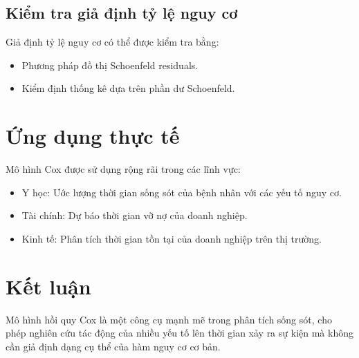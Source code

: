 \subsection{Kiểm tra giả định tỷ lệ nguy cơ}
Giả định tỷ lệ nguy cơ có thể được kiểm tra bằng:
\begin{itemize}
    \item Phương pháp đồ thị Schoenfeld residuals.
    \item Kiểm định thống kê dựa trên phần dư Schoenfeld.
\end{itemize}

\section{Ứng dụng thực tế}
Mô hình Cox được sử dụng rộng rãi trong các lĩnh vực:
\begin{itemize}
    \item Y học: Ước lượng thời gian sống sót của bệnh nhân với các yếu tố nguy cơ.
    \item Tài chính: Dự báo thời gian vỡ nợ của doanh nghiệp.
    \item Kinh tế: Phân tích thời gian tồn tại của doanh nghiệp trên thị trường.
\end{itemize}

\section{Kết luận}
Mô hình hồi quy Cox là một công cụ mạnh mẽ trong phân tích sống sót, cho phép nghiên cứu tác động của nhiều yếu tố lên thời gian xảy ra sự kiện mà không cần giả định dạng cụ thể của hàm nguy cơ cơ bản.
